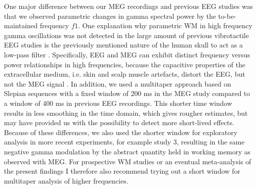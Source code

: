 One major difference between our MEG recordings and previous EEG studies was that we observed parametric changes in gamma spectral power by the to-be-maintained frequency $f1$. One explanation why parametric WM in high frequency gamma oscillations was not detected in the large amount of previous vibrotactile EEG studies \parencite{Herding2016,Spitzer2010,Spitzer2014,Spitzer2011,Spitzer2012} is the previously mentioned nature of the human skull to act as a low-pass filter \parencite{Pfurtscheller1975}. Specifically, EEG and MEG can exhibit distinct frequency versus power relationships in high frequencies, because the capacitive properties of the extracellular medium, i.e. skin and scalp muscle artefacts, distort the EEG, but not the MEG signal \parencite{Buzsaki2012,Dehghani2010,Demanuele2007}. In addition, we used a multitaper approach based on Slepian sequences with a fixed window of 200 ms in the MEG study compared to a window of 400 ms in previous EEG recordings. This shorter time window results in less smoothing in the time domain, which gives rougher estimates, but may have provided us with the possibility to detect more short-lived effects. Because of these differences, we also used the shorter window for exploratory analysis in more recent experiments, for example study 3, resulting in the same negative gamma modulation by the abstract quantity held in working memory as observed with MEG. For prospective WM studies or an eventual meta-analysis of the present findings I therefore also recommend trying out a short window for multitaper analysis of higher frequencies.

